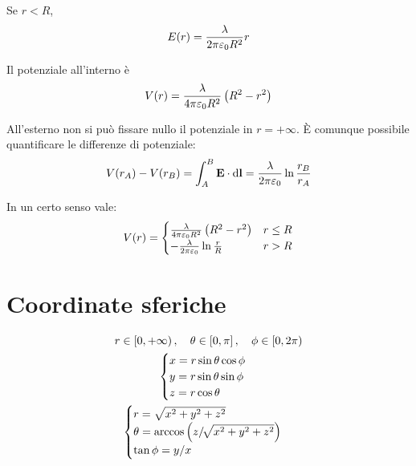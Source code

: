 Se $r < R$,
\begin{equation}
    E(r) = \frac{\lambda}{2\pi\varepsilon_0 R^2} r
\end{equation}

Il potenziale all'interno è
\begin{equation}
    V(r) = \frac{\lambda}{4\pi\varepsilon_0 R^2} \left( R^2 - r^2 \right)
\end{equation}

All'esterno non si può fissare nullo il potenziale in $r = +\infty$.
È comunque possibile quantificare le differenze di potenziale:
\begin{equation}
    V(r_A) - V(r_B) = \int_A^B \mathbf{E} \cdot \mathrm{d} \mathbf{l} = \frac{\lambda}{2\pi\varepsilon_0} \ln\frac{r_B}{r_A}
\end{equation}

In un certo senso vale:
\begin{equation}
    V(r) = \begin{cases}
        \frac{\lambda}{4\pi\varepsilon_0 R^2} \left( R^2 - r^2 \right) & r \le R \\
        - \frac{\lambda}{2\pi\varepsilon_0} \ln\frac{r}{R} & r > R
    \end{cases}
\end{equation}

\section{Coordinate sferiche}


\begin{subequations}
\begin{gather}
    r \in \left[0, +\infty\right), \quad \theta \in \left[0, \pi\right], \quad \phi \in \left[0, 2\pi\right) \\
    \begin{cases}
        x = r \sin \theta \cos \phi \\
        y = r \sin \theta \sin \phi \\
        z = r \cos \theta
    \end{cases} \\
    \begin{cases}
        r = \sqrt{x^2 + y^2 + z^2} \\
        \theta = \arccos\left( z/\!\sqrt{x^2 + y^2 + z^2} \right) \\
        \tan \phi = y/x
    \end{cases}
\end{gather}
\end{subequations}

